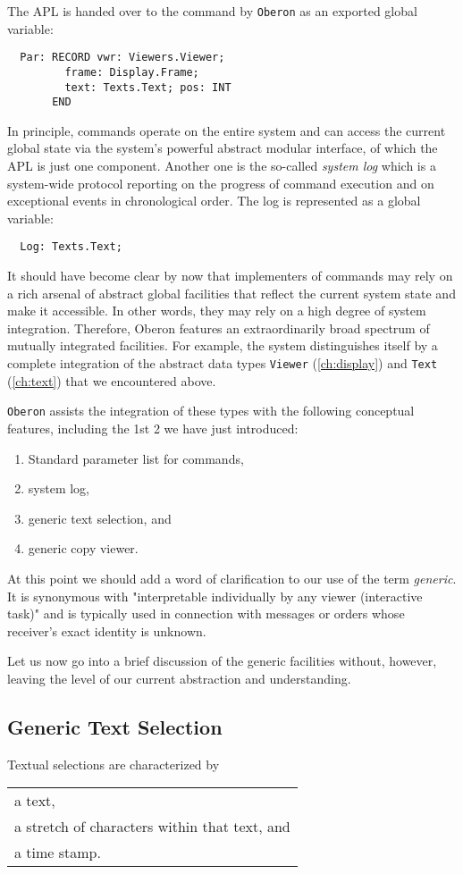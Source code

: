 The APL is handed over to the command by \verb|Oberon| as an exported global variable:
\begin{verbatim}
  Par: RECORD vwr: Viewers.Viewer;
         frame: Display.Frame;
         text: Texts.Text; pos: INT
       END
\end{verbatim}
In principle, commands operate on the entire system and can access the current global state
via the system's powerful abstract modular interface, of which the APL is just one component.
Another one is the so-called \emph{system log} which is a system-wide protocol reporting on
the progress of command execution and on exceptional events in chronological order. The log
is represented as a global variable:
\begin{verbatim}
  Log: Texts.Text;
\end{verbatim}
It should have become clear by now that implementers of commands may rely on a rich arsenal
of abstract global facilities that reflect the current system state and make it accessible.
In other words, they may rely on a high degree of system integration. Therefore, Oberon
features an extraordinarily broad spectrum of mutually integrated facilities. For example,
the system distinguishes itself by a complete integration of the abstract data types
\verb|Viewer| (\ref{ch:display}) and \verb|Text| (\ref{ch:text}) that we encountered above.

\verb|Oberon| assists the integration of these types with the following conceptual features,
including the 1st 2 we have just introduced:
\begin{enumerate}
  \item Standard parameter list for commands,
  \item system log,
  \item generic text selection, and
  \item generic copy viewer.
\end{enumerate}
At this point we should add a word of clarification to our use of the term \emph{generic}.
It is synonymous with "interpretable individually by any viewer (interactive task)" and is
typically used in connection with messages or orders whose receiver's exact identity is unknown.

Let us now go into a brief discussion of the generic facilities
without, however, leaving the level of our current abstraction and understanding.

\subsection{Generic Text Selection}
Textual selections are characterized by
\begin{table}[h!]
  \centering
  \begin{tabular}{l}
    a text, \\
    a stretch of characters within that text, and \\
    a time stamp.
  \end{tabular}
\end{table}

